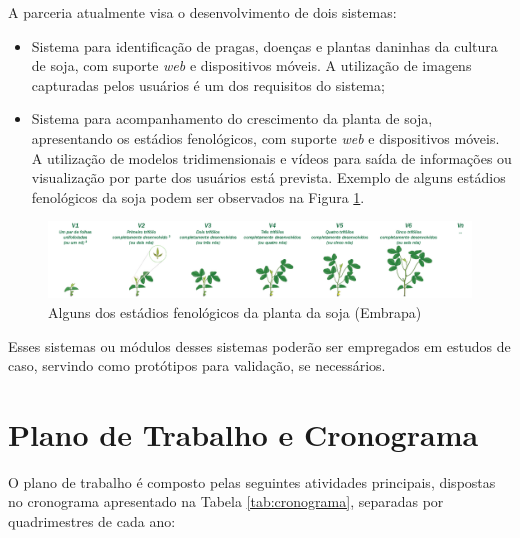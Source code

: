 \documentclass[12pt]{article}
\begin{document}
A parceria atualmente visa o desenvolvimento de dois sistemas:

\begin{itemize}
	\item Sistema para identificação de pragas, doenças e plantas daninhas da cultura de soja, com suporte \textit{web} e dispositivos móveis. A utilização de imagens capturadas pelos usuários é um dos requisitos do sistema;

	\item Sistema para acompanhamento do crescimento da planta de soja, apresentando os estádios fenológicos, com suporte \textit{web} e dispositivos móveis. A utilização de modelos tridimensionais e vídeos para saída de informações ou visualização por parte dos usuários está prevista. Exemplo de alguns estádios fenológicos da soja podem ser observados na Figura \ref{fig:estadios_fenelogicos}.
\end{itemize}

\begin{figure}
  \includegraphics[scale=0.5]{images/EstadiosFenologicos.png}
  \caption{Alguns dos estádios fenológicos da planta da soja (Embrapa)}
  \label{fig:estadios_fenelogicos}
\end{figure} 

Esses sistemas ou módulos desses sistemas poderão ser empregados em estudos de caso, servindo como protótipos para validação, se necessários. 

\section{Plano de Trabalho e Cronograma}
\label{sec:plano_trabalho_cronograma}

O plano de trabalho é composto pelas seguintes atividades principais, dispostas no cronograma apresentado na Tabela \ref{tab:cronograma}, separadas por quadrimestres de cada ano:
\end{document}
